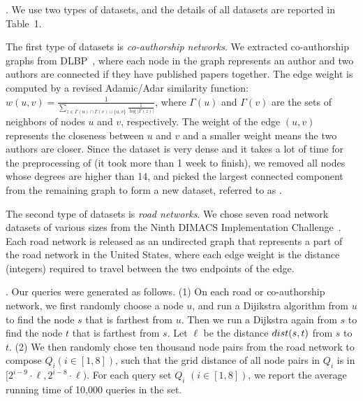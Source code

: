 .
We use two types of datasets, and the details of all datasets are reported in Table~1.



The first type of datasets is {\em co-authorship networks}. We extracted co-authorship graphs from DLBP~\cite{snapnets}, where each node in the graph represents an author and two authors are connected if they have published papers together. The edge weight is computed by a revised Adamic/Adar similarity function: $w(u,v) = \frac{1}{\sum_{z\in {\Gamma(u)\cap \Gamma(v) \cup \{u,v\}}}\frac{1}{\log{|\Gamma(z)|}}}$, where $\Gamma(u)$ and $\Gamma(v)$ are the sets of neighbors of nodes $u$ and $v$, respectively. The weight of the edge $(u,v)$ represents the closeness between $u$ and $v$ and a smaller weight means the two authors are closer. Since the \dblp dataset is very dense and it takes a lot of time for the preprocessing of \tnr (it took more than 1 week to finish), we removed all nodes whose degrees are higher than 14, and picked the largest connected component from the remaining graph to form a new dataset, referred to as \dblpone.


The second type of datasets is {\em road networks}. We chose seven road network datasets of various sizes from the Ninth DIMACS
Implementation Challenge~\cite{dimacs-datasets}. Each road network is released as an undirected graph that represents a part of the road network in the United States, where each edge weight is the distance (integers) required to travel between the two endpoints of the edge.


. Our queries were generated as follows.
(1) On each road  or co-authorship network, we first randomly choose a node $u$, and run a Dijikstra algorithm from $u$ to find the node $s$ that is farthest from $u$. Then we run a Dijkstra again from $s$ to find the node $t$ that is farthest from $s$. Let $\ell$ be the distance $\dist(s,t)$ from $s$ to $t$.
(2) We then randomly chose ten thousand node pairs from
the road network to compose $Q_i (i \in [1, 8])$, such that the grid
distance of all node pairs in $Q_i$ is in $[2^{i-9}\cdot\ell, 2^{i-8}\cdot\ell)$.
For each query set $Q_i$ $(i\in [1, 8])$, we report the average running time of 10,000 queries in the set.


